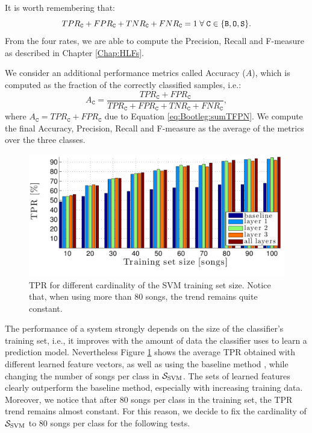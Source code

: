 It is worth remembering that:
\begin{equation}
TPR_{\texttt{C}}+FPR_{\texttt{C}}+TNR_{\texttt{C}}+FNR_{\texttt{C}}=1 \; \forall \; {\texttt{C}} \in \{\texttt{B}, \texttt{O}, \texttt{S} \}.
\label{eq:Bootleg:sumTFPN}
\end{equation}
From the four rates, we are able to compute the Precision, Recall and F-measure as described in Chapter \ref{Chap:HLFs}. %

We consider an additional performance metrics called Accuracy ($A$), which is computed as the fraction of the correctly classified samples, i.e.:
\begin{equation}
A_{\texttt{C}}=\frac{TPR_{\texttt{C}}+FPR_{\texttt{C}}}{TPR_{\texttt{C}}+FPR_{\texttt{C}}+TNR_{\texttt{C}}+FNR_{\texttt{C}}},
\end{equation}
where $A_{\texttt{C}}=TPR_{\texttt{C}}+FPR_{\texttt{C}}$ due to Equation \ref{eq:Bootleg:sumTFPN}. We compute the final Accuracy, Precision, Recall and F-measure as the average of the metrics over the three classes.

\begin{figure}[t]
\centering
\includegraphics[width=.95\columnwidth]{img/Bootleg/succ_rate_bar}
\caption{TPR for different cardinality of the SVM training set size. Notice that, when using more than 80 songs, the trend remains quite constant.}
\label{fig:Bootleg:succ_rate}
\end{figure}

The performance of a system strongly depends on the size of the classifier's training set, i.e., it improves with the amount of data the classifier uses to learn a prediction model. Nevertheless Figure \ref{fig:Bootleg:succ_rate} shows the average TPR obtained with different learned feature vectors, as well as using the baseline method \cite{Bestagini2013b}, while changing the number of songs per class in $\mathcal{S}_\text{SVM}$. The sets of learned features clearly outperform the baseline method, especially with increasing training data. Moreover, we notice that after 80 songs per class in the training set, the TPR trend remains almost constant. For this reason, we decide to fix the cardinality of $\mathcal{S}_\text{SVM}$ to 80 songs per class for the following tests.




